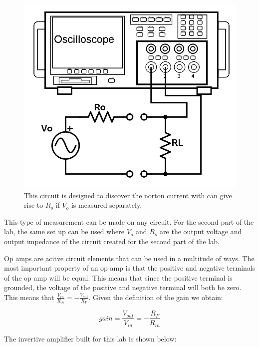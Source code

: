 \documentclass[twocolumn, amsmath]{revtex4}
\begin{document}
\begin{figure}[h]
    \includegraphics[scale=0.25]{output.png}  
    \caption{This circuit is designed to discover the norton current with can give rise to $R_{o}$ if $V_{o}$ is measured separately.}
\end{figure}

This type of measurement can be made on any circuit. For the second part of the lab, the same set up can be used where $V_{o}$ and $R_{o}$ are the output voltage and output impedance of the circuit created for the second part of the lab.

Op amps are acitve circuit elements that can be used in a multitude of ways. The most important property of an op amp is that the positive and negative terminals of the op amp will be equal. This means that since the positive terminal is grounded, the voltage of the positive and negative terminal will both be zero. This means that $\frac{V_{in}}{R_{in}} = -\frac{V_{out}}{R_{F}}$. Given the definition of the gain we obtain:

\begin{equation}
gain =  \frac{V_{out}}{V_{in}} = -\frac{R_{F}}{R_{in}}
\end{equation}

The invertive amplifier built for this lab is shown below:
\end{document}
